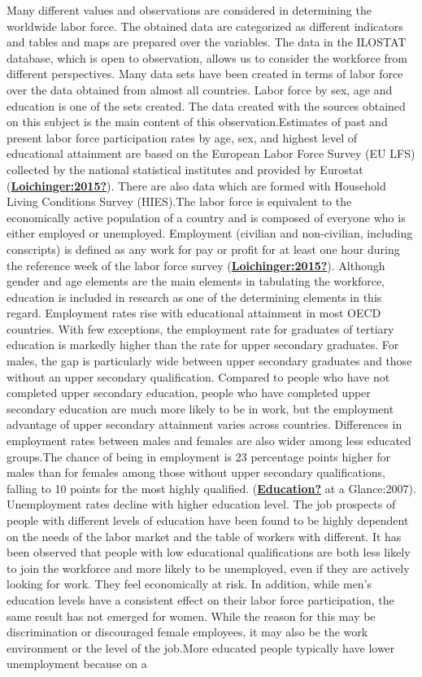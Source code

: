\documentclass[
  12pt,
]{article}
\begin{document}
Many different values and observations are considered in determining the worldwide labor force. The obtained data are categorized as different indicators and tables and maps are prepared over the variables. The data in the ILOSTAT database, which is open to observation, allows us to consider the workforce from different perspectives. Many data sets have been created in terms of labor force over the data obtained from almost all countries. Labor force by sex, age and education is one of the sets created. The data created with the sources obtained on this subject is the main content of this observation.Estimates of past and present labor force participation rates by age, sex, and highest level of educational attainment are based on the European Labor Force Survey (EU LFS) collected by the national statistical institutes and provided by Eurostat (\protect\hyperlink{ref-Loichinger:2015}{\textbf{Loichinger:2015?}}). There are also data which are formed with Household Living Conditions Survey (HIES).The labor force is equivalent to the economically active population of a country and is composed of everyone who is either employed or unemployed. Employment (civilian and non-civilian, including conscripts) is defined as any work for pay or profit for at least one hour during the reference week of the labor force survey (\protect\hyperlink{ref-Loichinger:2015}{\textbf{Loichinger:2015?}}). Although gender and age elements are the main elements in tabulating the workforce, education is included in research as one of the determining elements in this regard. Employment rates rise with educational attainment in most OECD countries. With few exceptions, the employment rate for graduates of tertiary education is markedly higher than the rate for upper secondary graduates. For males, the gap is particularly wide between upper secondary graduates and those without an upper secondary qualification. Compared to people who have not completed upper secondary education, people who have completed upper secondary education are much more likely to be in work, but the employment advantage of upper secondary attainment varies across countries. Differences in employment rates between males and females are also wider among less educated groups.The chance of being in employment is 23 percentage points higher for males than for females among those without upper secondary qualifications, falling to 10 points for the most highly qualified. (\protect\hyperlink{ref-Education}{\textbf{Education?}} at a Glance:2007). Unemployment rates decline with higher education level. The job prospects of people with different levels of education have been found to be highly dependent on the needs of the labor market and the table of workers with different. It has been observed that people with low educational qualifications are both less likely to join the workforce and more likely to be unemployed, even if they are actively looking for work. They feel economically at risk. In addition, while men's education levels have a consistent effect on their labor force participation, the same result has not emerged for women. While the reason for this may be discrimination or discouraged female employees, it may also be the work environment or the level of the job.More educated people typically have lower unemployment because on a 
\end{document}
